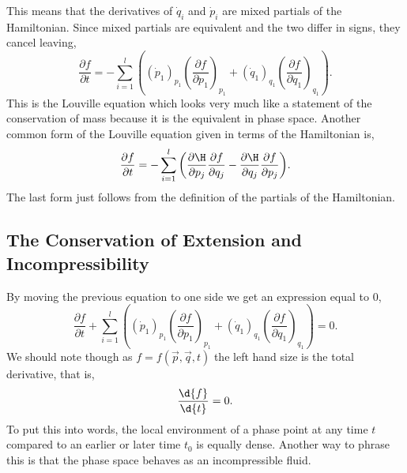 This means that the derivatives of $\dot{q}_{i}$ and $\dot{p}_{i}$ are mixed
partials of the Hamiltonian. Since mixed partials are equivalent and the two
differ in signs, they cancel leaving,
\begin{equation*}
	\frac{\partial f}{\partial t} = -\sum_{i=1}^{l}{\left((\dot{p}_{1})_{p_{1}}
	\left(\frac{\partial f}{\partial p_{1}}\right)_{p_{1}} +
	(\dot{q}_{1})_{q_{1}} \left(\frac{\partial f}{\partial
	q_{1}}\right)_{q_{1}}\right)}.
\end{equation*}
This is the Louville equation which looks very much like a statement of the
conservation of mass because it is the equivalent in phase space. Another common
form of the Louville equation given in terms of the Hamiltonian is,
\begin{equation*}
	\frac{\partial f}{\partial t} = -
	\sum_{i=1}^{l}{\left(\frac{\partial\H}{\partial p_{j}} \frac{\partial
		f}{\partial q_{j}} - \frac{\partial\H}{\partial q_{j}} \frac{\partial
		f}{\partial p_{j}}\right)}.
\end{equation*}
The last form just follows from the definition of the partials of the
Hamiltonian.

\subsection{The Conservation of Extension and Incompressibility}
By moving the previous equation to one side we get an expression equal to 0,
\begin{equation*}
	\frac{\partial f}{\partial t} + \sum_{i=1}^{l}{\left((\dot{p}_{1})_{p_{1}}
	\left(\frac{\partial f}{\partial p_{1}}\right)_{p_{1}} +
	(\dot{q}_{1})_{q_{1}} \left(\frac{\partial f}{\partial
	q_{1}}\right)_{q_{1}}\right)} = 0.
\end{equation*}
We should note though as $f = f(\vec{p},\vec{q},t)$ the left hand size is the
total derivative, that is,
\begin{equation*}
	\frac{\d{f}}{\d{t}} = 0.
\end{equation*}
To put this into words, the local environment of a phase point at any time $t$
compared to an earlier or later time $t_{0}$ is equally dense. Another way to
phrase this is that the phase space behaves as an incompressible fluid.

